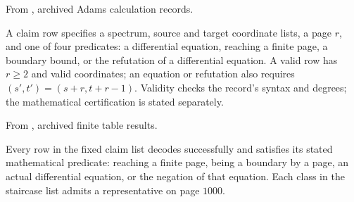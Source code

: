 \begin{definition}
\label{sem:Computation:table-claim-syntax}
From \cite{LinProgram}, archived Adams calculation records.\par
A claim row specifies a spectrum, source and target coordinate lists, a page $r$, and one of four predicates: a differential equation, reaching a finite page, a boundary bound, or the refutation of a differential equation. A valid row has $r\geq2$ and valid coordinates; an equation or refutation also requires $(s\prime,t\prime)=(s+r,t+r-1)$. Validity checks the record's syntax and degrees; the mathematical certification is stated separately.
\end{definition}

\begin{theorem}
\label{sem:Computation:table-certification}
From \cite{LinProgram}, archived finite table results.\par
Every row in the fixed claim list decodes successfully and satisfies its stated mathematical predicate: reaching a finite page, being a boundary by a page, an actual differential equation, or the negation of that equation. Each class in the staircase list admits a representative on page $1000$.
\end{theorem}



